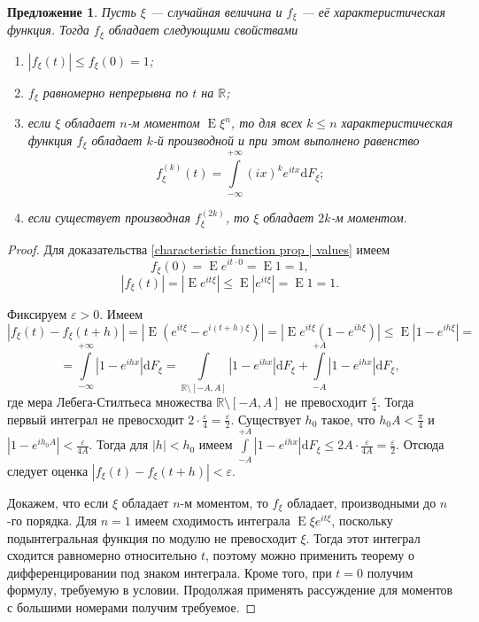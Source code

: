 \documentclass[12pt]{article}
\newtheorem{proposition}[theorem]{Предложение}
\numberwithin{theorem}{section}
\theoremstyle{definition}
\newcommand{\RR}{\mathbb{R}}
\newcommand{\expect}{\operatorname{E}}
\newcommand{\diff}{\mathrm{d}}
\begin{document}
	\begin{proposition} \label{characteristic function prop}
		Пусть $ \xi $ --- случайная величина и $ f_\xi $ --- её характеристическая функция.
		Тогда $ f_\xi $ обладает следующими свойствами
		\begin{enumerate}
			\item $ |f_\xi(t)| \leqslant f_\xi(0) = 1 $; \label{characteristic function prop | values}
			\item $ f_\xi $ равномерно непрерывна по $ t $ на $ \RR $; \label{characteristic function prop | uniformly}
			\item если $ \xi $ обладает $ n $-м моментом $ \expect\xi^n $,
			то для всех $ k \leqslant n $ характеристическая функция $ f_\xi $
			обладает $ k $-й производной и при этом выполнено равенство
			$$ f_\xi^{(k)}(t) = \int\limits_{-\infty}^{+\infty} (ix)^ke^{itx}\diff F_\xi; $$
			\label{characteristic function prop | moments => derivatives}
			\item если существует производная $ f_\xi^{(2k)} $, то $ \xi $ обладает $ 2k $-м моментом.
			\label{characteristic function prop | derivatives => moments}
		\end{enumerate}
	\end{proposition}
	
	\begin{proof}
		Для доказательства \ref{characteristic function prop | values} 
		имеем
		$$ f_\xi(0) = \expect e^{it \cdot 0} = \expect 1 = 1, $$
		$$ |f_\xi(t)| = |\expect e^{it\xi}| \leqslant \expect |e^{it\xi}| = \expect 1 = 1. $$
		
		Фиксируем $ \varepsilon > 0 $.
		Имеем
		$$ |f_\xi(t) - f_\xi(t + h)| = |\expect (e^{it\xi} - e^{i(t + h)\xi})|
		= |\expect e^{it\xi}(1 - e^{ih\xi})| \leqslant \expect |1 - e^{ih\xi}| = $$
		$$ = \int\limits_{-\infty}^{+\infty} |1 - e^{ihx}| \diff F_\xi
		=  \int\limits_{\RR \setminus [-A, A]} |1 - e^{ihx}| \diff F_\xi
		+ \int\limits_{-A}^{+A} |1 - e^{ihx}| \diff F_\xi, $$
		где мера Лебега-Стилтьеса множества $ \RR \setminus [-A, A] $ не превосходит $ \tfrac{\varepsilon}{4} $.
		Тогда первый интеграл не превосходит $ 2 \cdot \tfrac{\varepsilon}{4} = \tfrac{\varepsilon}{2} $.
		Существует $ h_0 $ такое, что $ h_0A < \tfrac{\pi}{4} $ и $ |1 - e^{ih_0A}| < \tfrac{\varepsilon}{4A} $.
		Тогда для $ |h| < h_0 $ имеем
		$ \int\limits_{-A}^{+A} |1 - e^{ihx}| \diff F_\xi \leqslant 2A \cdot \tfrac{\varepsilon}{4A} = \tfrac{\varepsilon}{2} $.
		Отсюда следует оценка $ |f_\xi(t) - f_\xi(t + h)| < \varepsilon $.
		
		Докажем, что если $ \xi $ обладает $ n $-м моментом, то $ f_\xi $ обладает, производными до $ n $-го
		порядка. Для $ n = 1 $ имеем сходимость интеграла $ \expect \xi e^{it\xi} $,
		поскольку подынтегральная функция по модулю не превосходит $ \xi $.
		Тогда этот интеграл сходится равномерно относительно $ t $,
		поэтому можно применить теорему о дифференцировании под знаком интеграла.
		Кроме того, при $ t = 0 $ получим формулу, требуемую в условии.
		Продолжая применять рассуждение для моментов с большими номерами получим требуемое.
	\end{proof}
	
\end{document}
